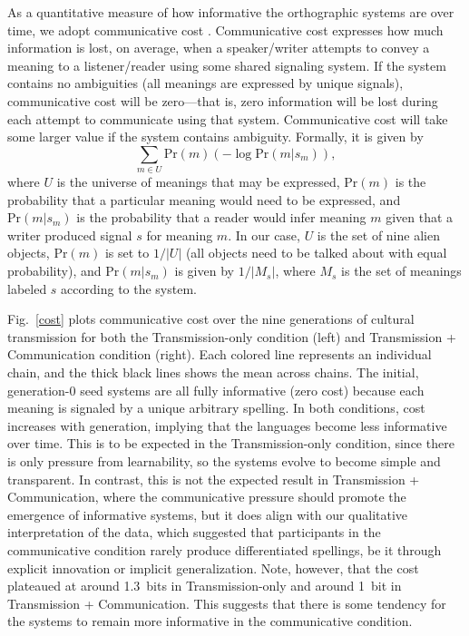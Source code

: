 \documentclass[doc,biblatex]{apa7}
\begin{document}
As a quantitative measure of how informative the orthographic systems are over time, we adopt communicative cost \parencite{KempRegier:2012, Regier:2015, Kemp:2018}. Communicative cost expresses how much information is lost, on average, when a speaker/writer attempts to convey a meaning to a listener/reader using some shared signaling system. If the system contains no ambiguities (all meanings are expressed by unique signals), communicative cost will be zero---that is, zero information will be lost during each attempt to communicate using that system. Communicative cost will take some larger value if the system contains ambiguity. Formally, it is given by%
	\begin{equation}
	\sum_{m \in U} \mathrm{Pr}(m) ( -\log \mathrm{Pr}(m|s_m) ),
	\end{equation}
where $U$ is the universe of meanings that may be expressed, $\mathrm{Pr}(m)$ is the probability that a particular meaning would need to be expressed, and $\mathrm{Pr}(m|s_m)$ is the probability that a reader would infer meaning $m$ given that a writer produced signal $s$ for meaning $m$. In our case, $U$ is the set of nine alien objects, $\mathrm{Pr}(m)$ is set to $1/|U|$ (all objects need to be talked about with equal probability), and $\mathrm{Pr}(m|s_m)$ is given by $1/|M_s|$, where $M_s$ is the set of meanings labeled $s$ according to the system.

Fig.~\ref{cost} plots communicative cost over the nine generations of cultural transmission for both the Transmission-only condition (left) and Transmission + Communication condition (right). Each colored line represents an individual chain, and the thick black lines shows the mean across chains. The initial, generation-0 seed systems are all fully informative (zero cost) because each meaning is signaled by a unique arbitrary spelling. In both conditions, cost increases with generation, implying that the languages become less informative over time. This is to be expected in the Transmission-only condition, since there is only pressure from learnability, so the systems evolve to become simple and transparent. In contrast, this is not the expected result in Transmission + Communication, where the communicative pressure should promote the emergence of informative systems, but it does align with our qualitative interpretation of the data, which suggested that participants in the communicative condition rarely produce differentiated spellings, be it through explicit innovation or implicit generalization. Note, however, that the cost plateaued at around 1.3~bits in Transmission-only and around 1~bit in Transmission + Communication. This suggests that there is some tendency for the systems to remain more informative in the communicative condition.
\end{document}
